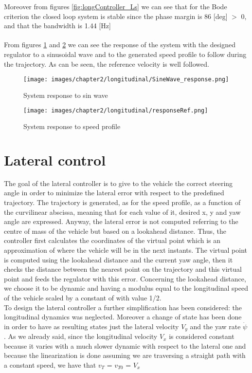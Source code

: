 \documentclass{report}
\let\Oldsection\section
\renewcommand{\section}{\FloatBarrier\Oldsection}
\begin{document}
Moreover from figures \ref{fig:longController_Ls} we can see that for the Bode criterion the closed loop system is stable since the phase margin is 86 [deg] $>$ 0, and that the bandwidth is 1.44 [Hz]
\\\\From figures \ref{fig:longController_sinwave} and \ref{fig:longController_vref} we can see the response of the system with the designed regulator to a sinusoidal wave and to the generated speed profile to follow during the trajectory. As can be seen, the reference velocity is well followed. 

\begin{figure}[h!]
    \centering
    \texttt{[image: images/chapter2/longitudinal/SineWave\_response.png]}
    \caption{System response to sin wave}
    \label{fig:longController_sinwave}
\end{figure}

\begin{figure}[h!]
    \centering
    \texttt{[image: images/chapter2/longitudinal/responseRef.png]}
    \caption{System response to speed profile}
    \label{fig:longController_vref}
\end{figure}


\section{Lateral control}
The goal of the lateral controller is to give to the vehicle the correct steering angle in order to minimize the lateral error with respect to the predefined trajectory. The trajectory is generated, as for the speed profile, as a function of the curvilinear abscissa, meaning that for each value of it, desired x, y and yaw angle are expressed. Anyway, the lateral error is not computed referring to the centre of mass of the vehicle but based on a lookahead distance. Thus, the controller first calculates the coordinates of the virtual point which is an approximation of where the vehicle will be in the next instants. The virtual point is computed using the lookahead distance and the current yaw angle, then it checks the distance between the nearest point on the trajectory and this virtual point and feeds the regulator with this error. Concerning the lookahead distance, we choose it to be dynamic and having a modulus equal to the longitudinal speed of the vehicle scaled by a constant of with value 1/2. 
\\To design the lateral controller a further simplification has been considered: the longitudinal dynamics was neglected. Moreover a change of state has been done in order to have as resulting states just the lateral velocity $V_y$ and the yaw rate $\dot{\psi}$. As we already said, since the longitudinal velocity $V_x$ is considered constant because it varies with a much slower dynamic with respect to the lateral one and because the linearization is done assuming we are traversing a straight path with a constant speed, we have that $v_T$ = $v_{T0}$ = $V_x$
\end{document}
